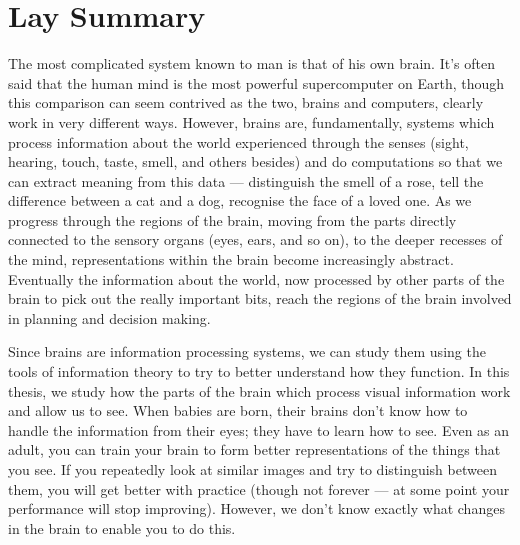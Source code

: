 

\begingroup

\let\clearpage\relax
\let\cleardoublepage\relax
\let\cleardoublepage\relax

\chapter*{Lay Summary}

The most complicated system known to man is that of his own brain.
It's often said that the human mind is the most powerful supercomputer on Earth, though this comparison can seem contrived as the two, brains and computers, clearly work in very different ways.
However, brains are, fundamentally, systems which process information about the world experienced through the senses (sight, hearing, touch, taste, smell, and others besides) and do computations so that we can extract meaning from this data --- distinguish the smell of a rose, tell the difference between a cat and a dog, recognise the face of a loved one.
As we progress through the regions of the brain, moving from the parts directly connected to the sensory organs (eyes, ears, and so on), to the deeper recesses of the mind, representations within the brain become increasingly abstract.
Eventually the information about the world, now processed by other parts of the brain to pick out the really important bits, reach the regions of the brain involved in planning and decision making.


Since brains are information processing systems, we can study them using the tools of information theory to try to better understand how they function.
In this thesis, we study how the parts of the brain which process visual information work and allow us to see.
When babies are born, their brains don't know how to handle the information from their eyes; they have to learn how to see.
Even as an adult, you can train your brain to form better representations of the things that you see.
If you repeatedly look at similar images and try to distinguish between them, you will get better with practice (though not forever --- at some point your performance will stop improving).
However, we don't know exactly what changes in the brain to enable you to do this.


